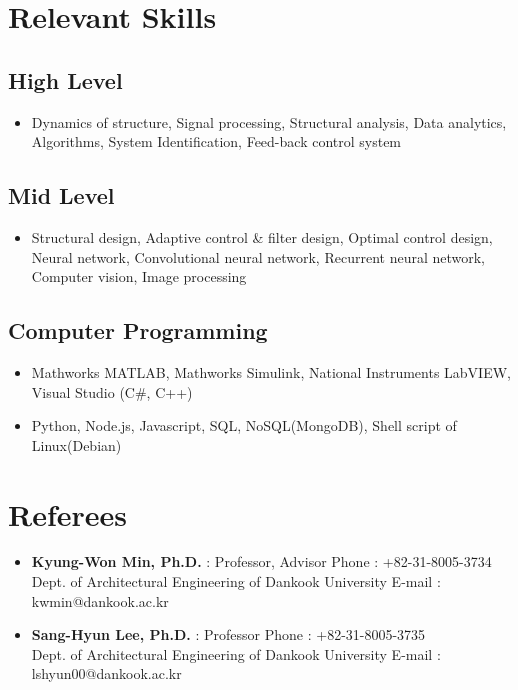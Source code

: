 \section*{Relevant Skills}
\subsection*{High Level}
\begin{itemize}
  \item[] Dynamics of structure, Signal processing, Structural analysis, Data analytics, Algorithms, System Identification, Feed-back control system
\end{itemize}
\subsection*{Mid Level}
\begin{itemize}
  \item[] Structural design, Adaptive control \& filter design, Optimal control design, Neural network, Convolutional neural network, Recurrent neural network, Computer vision, Image processing
\end{itemize}
\subsection*{Computer Programming}
\begin{itemize}
  \item[] Mathworks MATLAB, Mathworks Simulink, National Instruments LabVIEW, Visual Studio (C\#, C++)
  \item[] Python, Node.js, Javascript, SQL, NoSQL(MongoDB), Shell script of Linux(Debian)
\end{itemize}

\section*{Referees}
\begin{itemize}
  \item[] \textbf{Kyung-Won Min, Ph.D.} : Professor, Advisor \hfill Phone : +82-31-8005-3734 \\
  Dept. of Architectural Engineering of Dankook University \hfill E-mail : kwmin@dankook.ac.kr
  \item[] \textbf{Sang-Hyun Lee, Ph.D.} : Professor \hfill Phone : +82-31-8005-3735 \\
  Dept. of Architectural Engineering of Dankook University \hfill E-mail : lshyun00@dankook.ac.kr
\end{itemize}
